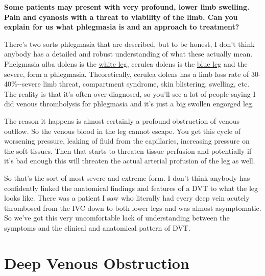 \documentclass[
]{book}
\begin{document}
\textbf{Some patients may present with very profound, lower limb swelling.
Pain and cyanosis with a threat to viability of the limb. Can you
explain for us what phlegmasia is and an approach to treatment?}

There's two sorts phlegmasia that are described, but to be honest, I
don't think anybody has a detailed and robust understanding of what
these actually mean. Phelgmasia alba dolens is the \href{https://www.google.com/search?q=Phlegmasia+alba+dolens\&client=safari\&rls=en\&sxsrf=ALiCzsY3xqSSjZro2T2oiRHzVPLniGwqAQ:1665422481903\&source=lnms\&tbm=isch\&sa=X\&ved=2ahUKEwj727ybltb6AhXJoWoFHe3xCsMQ_AUoAXoECAEQAw\&biw=1121\&bih=1148\&dpr=1}{white
leg},
cerulea dolens is the \href{https://www.google.com/search?q=Phlegmasia+cerulea+dolens\&tbm=isch\&ved=2ahUKEwjIicmcltb6AhURQUIHHV_iC8gQ2-cCegQIABAA\&oq=Phlegmasia+cerulea+dolens\&gs_lcp=CgNpbWcQAzIICAAQgAQQsQMyBQgAEIAEMgUIABCABDIFCAAQgAQyBQgAEIAEMgUIABCABDIFCAAQgAQyBQgAEIAEMgUIABCABDIFCAAQgAQ6BAgjECc6BAgAEEM6BggAEAUQHjoECAAQHjoGCAAQBxAeUNTtA1jNhgRg_JEEaAFwAHgBgAF0iAHEC5IBBDE2LjGYAQCgAQGqAQtnd3Mtd2l6LWltZ8ABAQ\&sclient=img\&ei=lFREY8jvC5GCieoP38SvwAw\&bih=1148\&biw=1121\&client=safari}{blue
leg}
and the severe, form a phlegmasia. Theoretically, cerulea dolens has a
limb loss rate of 30-40\%-\/-severe limb threat, compartment syndrome,
skin blistering, swelling, etc. The reality is that it's often
over-diagnosed, so you'll see a lot of people saying I did venous
thrombolysis for phlegmasia and it's just a big swollen engorged leg.

The reason it happens is almost certainly a profound obstruction of
venous outflow. So the venous blood in the leg cannot escape. You get
this cycle of worsening pressure, leaking of fluid from the capillaries,
increasing pressure on the soft tissues. Then that starts to threaten
tissue perfusion and potentially if it's bad enough this will threaten
the actual arterial profusion of the leg as well.

So that's the sort of most severe and extreme form. I don't think
anybody has confidently linked the anatomical findings and features of a
DVT to what the leg looks like. There was a patient I saw who literally
had every deep vein acutely thrombosed from the IVC down to both lower
legs and was almost asymptomatic. So we've got this very uncomfortable
lack of understanding between the symptoms and the clinical and
anatomical pattern of DVT.

\hypertarget{deep-venous-obstruction}{%
\section{Deep Venous Obstruction}\label{deep-venous-obstruction}}
\end{document}
